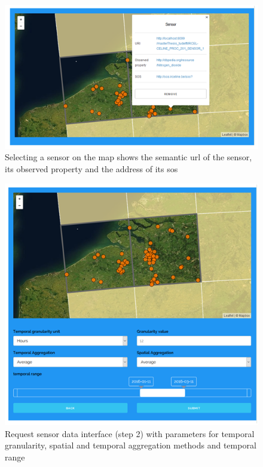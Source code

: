 \begin{figure}
	\centering
	\includegraphics[width=\linewidth]{figs/interface3.PNG}
	\caption{Selecting a sensor on the map shows the semantic \ac{url} of the sensor, its observed property and the address of its \ac{sos}}
	\label{fig:interface2}
\end{figure}

\begin{figure}
	\centering
	\includegraphics[width=\linewidth]{figs/interface2.PNG}
	\caption{Request sensor data interface (step 2) with parameters for temporal granularity, spatial and temporal aggregation methods and temporal range}
	\label{fig:interface3}
\end{figure}

